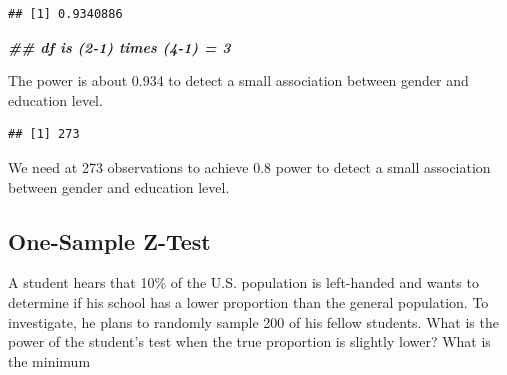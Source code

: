 \documentclass[
]{book}
\newenvironment{Shaded}{\begin{snugshade}}{\end{snugshade}}
\newcommand{\AttributeTok}[1]{\textcolor[rgb]{0.13,0.29,0.53}{#1}}
\newcommand{\DecValTok}[1]{\textcolor[rgb]{0.00,0.00,0.81}{#1}}
\newcommand{\DocumentationTok}[1]{\textcolor[rgb]{0.56,0.35,0.01}{\textbf{\textit{#1}}}}
\newcommand{\FloatTok}[1]{\textcolor[rgb]{0.00,0.00,0.81}{#1}}
\newcommand{\FunctionTok}[1]{\textcolor[rgb]{0.13,0.29,0.53}{\textbf{#1}}}
\newcommand{\NormalTok}[1]{#1}
\newcommand{\SpecialCharTok}[1]{\textcolor[rgb]{0.81,0.36,0.00}{\textbf{#1}}}
\newcommand{\StringTok}[1]{\textcolor[rgb]{0.31,0.60,0.02}{#1}}
\theoremstyle{definition}
\theoremstyle{definition}
\theoremstyle{definition}
\theoremstyle{definition}
\theoremstyle{remark}
\begin{document}
\begin{verbatim}
## [1] 0.9340886
\end{verbatim}

\begin{Shaded}
\begin{Highlighting}[]
\DocumentationTok{\#\# df is (2{-}1) times (4{-}1) = 3}
\end{Highlighting}
\end{Shaded}

The power is about 0.934 to detect a small association between gender and education level.

\begin{Shaded}
\end{Shaded}

\begin{verbatim}
## [1] 273
\end{verbatim}

We need at 273 observations to achieve 0.8 power to detect a small association between gender and education level.

\hypertarget{one-sample-z-test}{%
\subsection{One-Sample Z-Test}\label{one-sample-z-test}}

A student hears that 10\% of the U.S. population is left-handed and wants to determine if his school has a lower proportion than the general population. To investigate, he plans to randomly sample 200 of his fellow students. What is the power of the student's test when the true proportion is slightly lower? What is the minimum

\begin{Shaded}
\end{Shaded}
\end{document}
